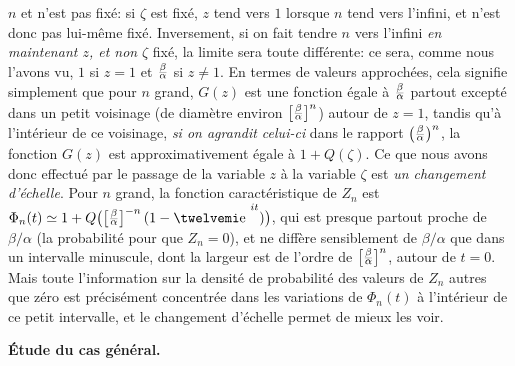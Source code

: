 $n$ et n'est pas fix\'e: si $\zeta$ est fix\'e, $z$ tend vers $1$ lorsque 
$n$ tend vers l'infini, et  n'est donc pas lui-m\^eme fix\'e. Inversement,
si on fait tendre $n$ vers l'infini {\it en maintenant $z$, et non} $\zeta$
fix\'e, la limite sera  toute diff\'erente: ce sera, comme nous l'avons vu,
$1$ si $z=1$ et ${\beta\strup{1.7}\over\textdown\alpha }$ si $z
\neq 1$. En termes de valeurs approch\'ees, cela signifie simplement que
pour  $n$ grand, $G(z)$ est une fonction \'egale  \`a
${\beta\strup{1.7}\over\textdown\alpha }$ partout except\'e dans  
un petit voisinage (de diam\`etre environ $\bigl[
{\beta \strup{1.7}\over\textdown\alpha }  \bigr]^n$) autour de
$z=1$, tandis qu'\`a l'int\'erieur de ce voisinage, {\it si  on agrandit
celui-ci}  dans le rapport $\bigl( {\beta\strup{1.7}\over\textdown 
\alpha } \bigr)^n$, la fonction $G(z)$ est approximativement \'egale \`a
$1 + Q(\zeta )$. Ce que nous avons donc effectu\'e par le passage de la
variable $z$ \`a la variable $\zeta$ est {\it un changement d'\'echelle}.
Pour $n$ grand, la fonction caract\'eristique de $Z_n$ est $\Phi_n(t)
\simeq 1 + Q\big(\bigl[ {\beta\strup{1.7}
\over\textdown\alpha }  \bigr]^{-n}\, (1 - \e^{it}) \big)$, qui est 
presque partout proche de $\beta / \alpha$ (la probabilit\'e pour que $Z_n
= 0$), et ne diff\`ere sensiblement de $\beta / \alpha$ que  dans un
intervalle minuscule, dont la largeur est de l'ordre de $\bigl[ {\beta
\strup{1.7}\over\textdown\alpha }  \bigr]^n$, autour de $t=0$. Mais
toute l'information sur la densit\'e de probabilit\'e des valeurs de $Z_n$
autres que z\'ero est pr\'ecis\'ement concentr\'ee dans les variations de 
$\Phi_n(t)$ \`a l'int\'erieur de ce petit intervalle, et le changement
d'\'echelle permet de mieux les voir.

\bigskip

{\bf \'Etude du cas g\'en\'eral.}
\medskip

